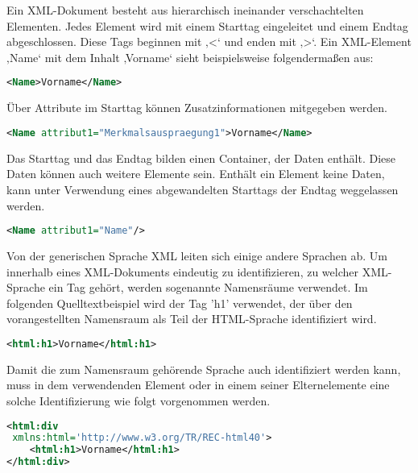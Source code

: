 Ein \ac{XML}-Dokument besteht aus hierarchisch ineinander verschachtelten Elementen. Jedes Element wird mit einem Starttag eingeleitet und einem Endtag abgeschlossen. Diese Tags beginnen mit ‚<‘ und enden mit ‚>‘. \cite[S. 34, 41-44]{North.Hermans.2000}
Ein \ac{XML}-Element ‚Name‘ mit dem Inhalt ‚Vorname‘ sieht beispielsweise folgendermaßen aus:

\begin{lstlisting}[language=XML]
<Name>Vorname</Name>
\end{lstlisting}

Über Attribute im Starttag können Zusatzinformationen mitgegeben werden. \cite[S. 40]{North.Hermans.2000}

\begin{lstlisting}[language=XML]
<Name attribut1="Merkmalsauspraegung1">Vorname</Name>
\end{lstlisting}

Das Starttag und das Endtag bilden einen Container, der Daten enthält. Diese Daten können auch weitere Elemente sein. Enthält ein Element keine Daten, kann unter Verwendung eines abgewandelten Starttags der Endtag weggelassen werden. \cite[S. 41]{North.Hermans.2000}

\begin{lstlisting}[language=XML]
<Name attribut1="Name"/>
\end{lstlisting}

Von der generischen Sprache XML leiten sich einige andere Sprachen ab. Um innerhalb eines XML-Dokuments eindeutig zu identifizieren, zu welcher XML-Sprache ein Tag gehört, werden sogenannte Namensräume verwendet. \cite{Bray.1998}
Im folgenden Quelltextbeispiel wird der Tag 'h1' verwendet, der über den vorangestellten Namensraum als Teil der HTML-Sprache identifiziert wird. 

\begin{lstlisting}[language=XML]
<html:h1>Vorname</html:h1>
\end{lstlisting}

Damit die zum Namensraum gehörende Sprache auch identifiziert werden kann, muss in dem verwendenden Element oder in einem seiner Elternelemente eine solche Identifizierung wie folgt vorgenommen werden. \cite{Bray.1998}

\begin{lstlisting}[language=XML]
<html:div
 xmlns:html='http://www.w3.org/TR/REC-html40'>
	<html:h1>Vorname</html:h1>
</html:div>
\end{lstlisting}

